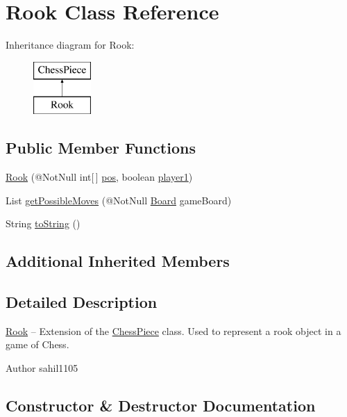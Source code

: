 \hypertarget{class_rook}{}\section{Rook Class Reference}
\label{class_rook}
Inheritance diagram for Rook\+:\begin{figure}[H]
\begin{center}
\leavevmode
\includegraphics[height=2.000000cm]{class_rook}
\end{center}
\end{figure}
\subsection*{Public Member Functions}
\begin{DoxyCompactItemize}
\item 
\mbox{\hyperlink{class_rook_aa18756a843ae1cbe7af284ed582e0537}{Rook}} (@Not\+Null int\mbox{[}$\,$\mbox{]} \mbox{\hyperlink{class_chess_piece_ae9f0da2b5fca2557eab359044a7ba1ac}{pos}}, boolean \mbox{\hyperlink{class_chess_piece_aa8711ff5ce8a45159b9b30c8148a34b2}{player1}})
\item 
List \mbox{\hyperlink{class_rook_a6151ec8ce039caaa1b0447b7e9f71659}{get\+Possible\+Moves}} (@Not\+Null \mbox{\hyperlink{class_board}{Board}} game\+Board)
\item 
String \mbox{\hyperlink{class_rook_aa112da23bdcf3cee4d7f96ee04717f99}{to\+String}} ()
\end{DoxyCompactItemize}
\subsection*{Additional Inherited Members}


\subsection{Detailed Description}
\mbox{\hyperlink{class_rook}{Rook}} -- Extension of the \mbox{\hyperlink{class_chess_piece}{Chess\+Piece}} class. Used to represent a rook object in a game of Chess. \begin{DoxyAuthor}{Author}
sahil1105 
\end{DoxyAuthor}


\subsection{Constructor \& Destructor Documentation}
\mbox{\label{class_rook_aa18756a843ae1cbe7af284ed582e0537}} 
